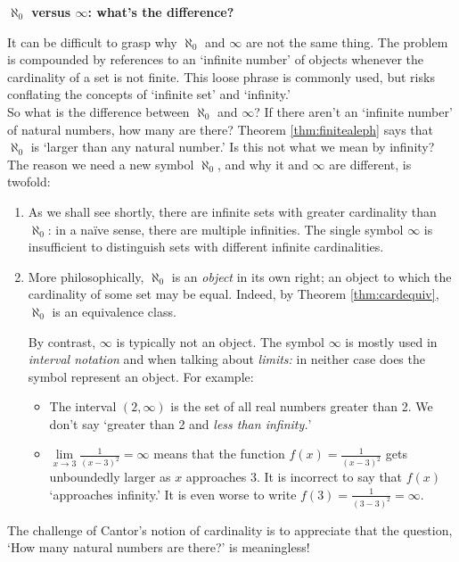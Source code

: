 \begin{aside}{}{}
{\bf $\aleph_0$ versus $\infty$: what's the difference?}

It can be difficult to grasp why $\aleph_0$ and $\infty$ are not the same thing. The problem is compounded by references to an `infinite number' of objects whenever the cardinality of a set is not finite. This loose phrase is commonly used, but risks conflating the concepts of `infinite set' and `infinity.'\\
So what is the difference between $\aleph_0$ and $\infty$? If there aren't an `infinite number' of natural numbers, how many are there? Theorem \ref{thm:finitealeph} says that $\aleph_0$ is `larger than any natural number.' Is this not what we mean by infinity? The reason we need a new symbol $\aleph_0$, and why it and $\infty$ are different, is twofold:
\begin{enumerate}
\item As we shall see shortly, there are infinite sets with greater cardinality than $\aleph_0$: in a naïve sense, there are multiple infinities. The single symbol $\infty$ is insufficient to distinguish sets with different infinite cardinalities.
\item More philosophically, $\aleph_0$ is an \emph{object} in its own right; an object to which the cardinality of some set may be equal. Indeed, by Theorem \ref{thm:cardequiv}, $\aleph_0$ is an equivalence class.

By contrast, $\infty$ is typically not an object. The symbol $\infty$ is mostly used in \emph{interval notation} and when talking about \emph{limits:} in neither case does the symbol represent an object. For example:
\begin{itemize}
  \item The interval $(2,\infty)$ is the set of all real numbers greater than 2. We don't say `greater than 2 and \emph{less than infinity.}'
  \item $\lim\limits_{x\to 3}\frac 1{(x-3)^2}=\infty$ means that the function $f(x)=\frac 1{(x-3)^2}$ gets unboundedly larger as $x$ approaches 3. It is incorrect to say that $f(x)$ `approaches infinity.' It is even worse to write $f(3)=\frac 1{(3-3)^2}=\infty$.
\end{itemize}
\end{enumerate}

 The challenge of Cantor's notion of cardinality is to appreciate that the question, `How many natural numbers are there?' is meaningless!
\end{aside}

